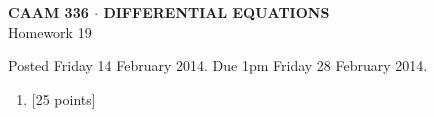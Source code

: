 \documentclass[10pt]{article}
\begin{document}
\vspace*{-5em}
\begin{center}
\large \textsf{\textbf{CAAM 336 $\cdot$ DIFFERENTIAL EQUATIONS}\\[0.5em]
Homework 19 }
\end{center}

Posted Friday 14 February 2014.  Due 1pm Friday 28 February 2014.

\begin{enumerate}\addtocounter{enumi}{18}
\item {[25 points]}  
\end{enumerate}
\end{document}
